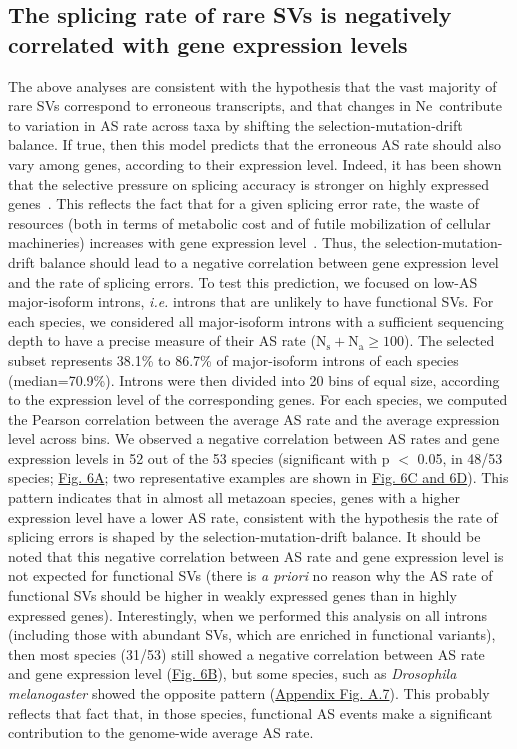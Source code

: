 \subsection{The splicing rate of rare SVs is negatively correlated with gene expression levels}
The above analyses are consistent with the hypothesis that the vast majority of rare \acrshort{SV}s correspond to erroneous transcripts, and that changes in \acrshort{Ne}~contribute to variation in AS rate across taxa by shifting the selection-mutation-drift balance. If true, then this model predicts that the erroneous AS rate should also vary among genes, according to their expression level. Indeed, it has been shown that the selective pressure on splicing accuracy is stronger on highly expressed genes~\citep{saudemont_fitness_2017}. This reflects the fact that for a given splicing error rate, the waste of resources (both in terms of metabolic cost and of futile mobilization of cellular machineries) increases with gene expression level~\citep{saudemont_fitness_2017,xiong_drift_2017}. Thus, the selection-mutation-drift balance should lead to a negative correlation between gene expression level and the rate of splicing errors. To test this prediction, we focused on low-AS major-isoform introns, \textit{i.e.} introns that are unlikely to have functional \acrshort{SV}s. For each species, we considered all major-isoform introns with a sufficient sequencing depth to have a precise measure of their AS rate ($\mathrm{N_s+N_a}\geq100$). The selected subset represents 38.1\% to 86.7\% of major-isoform introns of each species (median=70.9\%). Introns were then divided into 20 bins of equal size, according to the expression level of the corresponding genes. For each species, we computed the Pearson correlation between the average AS rate and the average expression level across bins. We observed a negative correlation between AS rates and gene expression levels in 52 out of the 53 species (significant with p $<$ 0.05, in 48/53 species; \hyperref[fig:AS6]{Fig. 6A}; two representative examples are shown in \hyperref[fig:AS6]{Fig. 6C and 6D}). This pattern indicates that in almost all metazoan species, genes with a higher expression level have a lower AS rate, consistent with the hypothesis the rate of splicing errors is shaped by the selection-mutation-drift balance. It should be noted that this negative correlation between AS rate and gene expression level is not expected for functional \acrshort{SV}s (there is \textit{a priori} no reason why the AS rate of functional \acrshort{SV}s should be higher in weakly expressed genes than in highly expressed genes). Interestingly, when we performed this analysis on all introns (including those with abundant \acrshort{SV}s, which are enriched in functional variants), then most species (31/53) still showed a negative correlation between AS rate and gene expression level (\hyperref[fig:AS6]{Fig. 6B}), but some species, such as \textit{Drosophila melanogaster} showed the opposite pattern (\hyperref[supp_fig:AS7]{Appendix Fig. A.7}). This probably reflects that fact that, in those species, functional AS events make a significant contribution to the genome-wide average AS rate.

